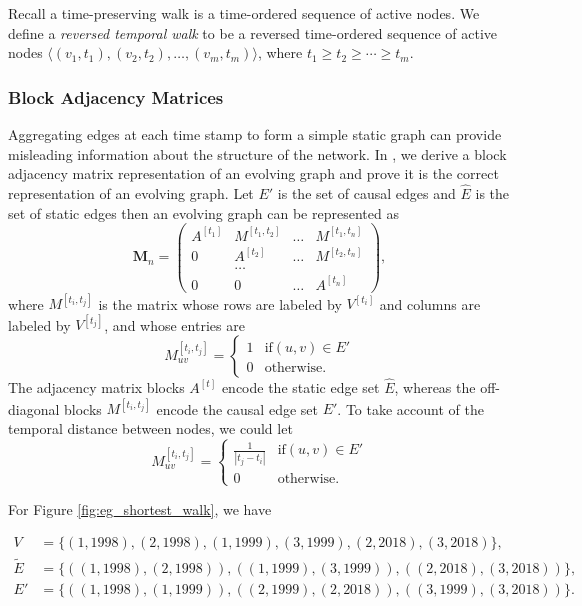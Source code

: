 \documentclass[12pt]{article}
\theoremstyle{definition}
\begin{document}
Recall a time-preserving walk is a time-ordered sequence of active nodes. We define a \emph{reversed temporal walk} to be a reversed time-ordered sequence of active nodes
$\langle (v_1, t_1), (v_2,t_2), \ldots, (v_m, t_m)\rangle$, where
$t_1 \ge t_2 \ge \cdots \ge t_m$.


\subsubsection{Block Adjacency Matrices}
\label{sec:centr-block-adjac}

Aggregating edges at each time stamp to form
a simple static graph can provide misleading information about the structure of the network.
In \cite{chen16}, we derive a block adjacency matrix representation of an evolving graph and prove it is the correct representation of an evolving graph.
Let $E'$ is the set of causal edges and $\hat E$ is the set of static edges then
an evolving graph can be represented as
$$
\bm M_n =
\begin{pmatrix}
A^{[t_1]} & M^{[t_1, t_2]} & \ldots & M^{[t_1, t_n]} \\
0         & A^{[t_2]} & \ldots & M^{[t_2, t_n]} \\
          & \ldots    &        &     \\
0         & 0         & \ldots & A^{[t_n]}
\end{pmatrix},
$$
where $M^{[t_i, t_j]}$ is the matrix whose rows are labeled by $V^{[t_i]}$ and columns are labeled by $V^{[t_j]}$, and whose entries are
$$
  M_{uv}^{[t_i, t_j]} =
  \begin{cases}
    1 & \mbox{if} (u, v) \in E' \\
    0 & \mbox{otherwise}.
  \end{cases}
$$
The adjacency matrix blocks $A^{[t]}$ encode the static edge set $\hat E$, whereas the off-diagonal blocks $M^{[t_i, t_j]}$ encode the causal edge set $E'$. To take account of the temporal distance between nodes, we could let
$$
  M_{uv}^{[t_i, t_j]} =
  \begin{cases}
    \frac{1}{|t_j - t_i|} & \mbox{if} (u, v) \in E' \\
    0 & \mbox{otherwise}.
  \end{cases}
$$

For Figure \ref{fig:eg_shortest_walk}, we have

\begin{align*}
V & = \{(1,\!1998), (2,\!1998), (1,\!1999), (3,\!1999), (2,\!2018), (3,\!2018)\},\\
\tilde E &= \{((1,\!1998), (2,\!1998)), ((1,\!1999), (3,\!1999)), ((2,\!2018), (3,\!2018))\},\\
E'  &= \{((1,\!1998), (1,\!1999)), ((2,\!1999), (2,\!2018)), ((3,\!1999), (3,\!2018))\}.
\end{align*}
\end{document}
